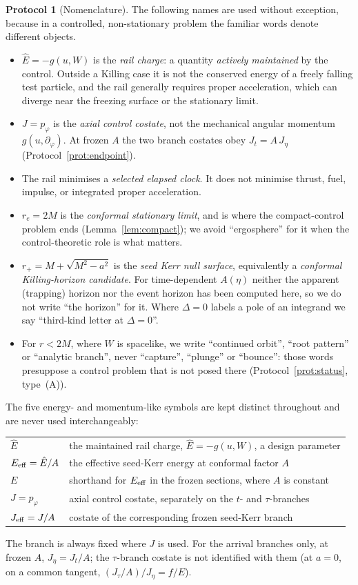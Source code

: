 \documentclass[12pt]{iopart}
\theoremstyle{plain}
\theoremstyle{definition}
\newtheorem{protocol}{Protocol}
\theoremstyle{remark}
\newcommand{\Ehat}{\hat E}
\newcommand{\rp}{r_{+}}
\newcommand{\re}{r_{e}}
\begin{document}
\begin{protocol}[Nomenclature]
\label{prot:names}
The following names are used without exception, because in a controlled,
non-stationary problem the familiar words denote different objects.
\begin{itemize}
\item $\Ehat=-g(u,W)$ is the \emph{rail charge}: a quantity \emph{actively
maintained} by the control. Outside a Killing case it is not the conserved
energy of a freely falling test particle, and the rail generally requires proper
acceleration, which can diverge near the freezing surface or the stationary
limit.
\item $J=p_\varphi$ is the \emph{axial control costate}, not the mechanical
angular momentum $g(u,\partial_\varphi)$. At frozen $A$ the two branch costates
obey $J_t=A\,J_\eta$ (Protocol~\ref{prot:endpoint}).
\item The rail minimises a \emph{selected elapsed clock}. It does not minimise
thrust, fuel, impulse, or integrated proper acceleration.
\item $\re=2M$ is the \emph{conformal stationary limit}, and is where the
compact-control problem ends (Lemma~\ref{lem:compact}); we avoid ``ergosphere''
for it when the control-theoretic role is what matters.
\item $\rp=M+\sqrt{M^2-a^2}$ is the \emph{seed Kerr null surface}, equivalently a
\emph{conformal Killing-horizon candidate}. For time-dependent $A(\eta)$ neither
the apparent (trapping) horizon nor the event horizon has been computed here, so
we do not write ``the horizon'' for it. Where $\Delta=0$ labels a pole of an
integrand we say ``third-kind letter at $\Delta=0$''.
\item For $r<2M$, where $W$ is spacelike, we write ``continued orbit'', ``root
pattern'' or ``analytic branch'', never ``capture'', ``plunge'' or ``bounce'':
those words presuppose a control problem that is not posed there
(Protocol~\ref{prot:status}, type~(A)).
\end{itemize}
The five energy- and momentum-like symbols are kept distinct throughout and are
never used interchangeably:
\begin{center}
\begin{tabular}{@{}ll@{}}
\hline
$\Ehat$ & the maintained rail charge, $\Ehat=-g(u,W)$, a design parameter\\
$E_{\rm eff}=\Ehat/A$ & the effective seed-Kerr energy at conformal factor $A$\\
$E$ & shorthand for $E_{\rm eff}$ in the frozen sections, where $A$ is constant\\
$J=p_\varphi$ & axial control costate, separately on the $t$- and $\tau$-branches\\
$J_{\rm eff}=J/A$ & costate of the corresponding frozen seed-Kerr branch\\
\hline
\end{tabular}
\end{center}
The branch is always fixed where $J$ is used. For the arrival branches only, at frozen $A$,
$J_\eta=J_t/A$; the $\tau$-branch costate is not identified with them (at $a=0$, on a
common tangent, $(J_\tau/A)/J_\eta=f/E$).


\end{protocol}
\end{document}
